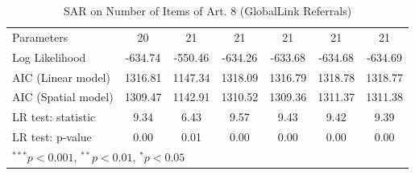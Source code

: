 \begin{table}[!h]
\begin{center}
\begin{tabular}{l c c c c c c }
Parameters              & 20           & 21           & 21           & 21           & 21           & 21           \\
Log Likelihood          & -634.74      & -550.46      & -634.26      & -633.68      & -634.68      & -634.69      \\
AIC (Linear model)      & 1316.81      & 1147.34      & 1318.09      & 1316.79      & 1318.78      & 1318.77      \\
AIC (Spatial model)     & 1309.47      & 1142.91      & 1310.52      & 1309.36      & 1311.37      & 1311.38      \\
LR test: statistic      & 9.34         & 6.43         & 9.57         & 9.43         & 9.42         & 9.39         \\
LR test: p-value        & 0.00         & 0.01         & 0.00         & 0.00         & 0.00         & 0.00         \\
\bottomrule
\multicolumn{7}{l}{\scriptsize{$^{***}p<0.001$, $^{**}p<0.01$, $^*p<0.05$}}
\end{tabular}
\caption{SAR on Number of Items of Art. 8 (GlobalLink Referrals)}
\label{table:coefficients}
\end{center}
\end{table}
